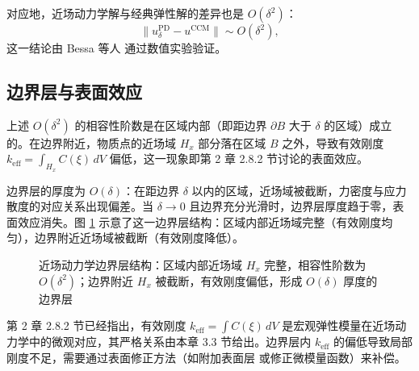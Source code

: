 对应地，近场动力学解与经典弹性解的差异也是 $O(\delta^2)$：
\begin{equation}
\label{eq:solution-error}
\|u^{\mathrm{PD}}_\delta - u^{\mathrm{CCM}}\| \sim O(\delta^2),
\end{equation}
这一结论由 Bessa 等人 \cite{Bessa2014} 通过数值实验验证。

\subsection{边界层与表面效应}
\label{subsec:boundary-layer}

上述 $O(\delta^2)$ 的相容性阶数是在区域内部（即距边界 $\partial B$ 大于 $\delta$ 的区域）成立的。在边界附近，物质点的近场域 $H_x$ 部分落在区域 $B$ 之外，导致有效刚度 $k_{\mathrm{eff}}=\int_{H_x}C(\xi)\,dV$ 偏低，这一现象即第 2 章 2.8.2 节讨论的表面效应。

边界层的厚度为 $O(\delta)$：在距边界 $\delta$ 以内的区域，近场域被截断，力密度与应力散度的对应关系出现偏差。当 $\delta\to 0$ 且边界充分光滑时，边界层厚度趋于零，表面效应消失。图 \ref{fig:boundary-layer} 示意了这一边界层结构：区域内部近场域完整（有效刚度均匀），边界附近近场域被截断（有效刚度降低）。

\begin{figure}[htbp]
\centering
{}
\caption{近场动力学边界层结构：区域内部近场域 $H_x$ 完整，相容性阶数为 $O(\delta^2)$；边界附近 $H_x$ 被截断，有效刚度偏低，形成 $O(\delta)$ 厚度的边界层}
\label{fig:boundary-layer}
\end{figure}

第 2 章 2.8.2 节已经指出，有效刚度 $k_{\mathrm{eff}}=\int C(\xi)\,dV$ 是宏观弹性模量在近场动力学中的微观对应，其严格关系由本章 3.3 节给出。边界层内 $k_{\mathrm{eff}}$ 的偏低导致局部刚度不足，需要通过表面修正方法（如附加表面层 \cite{LeBobaru2018} 或修正微模量函数）来补偿。

